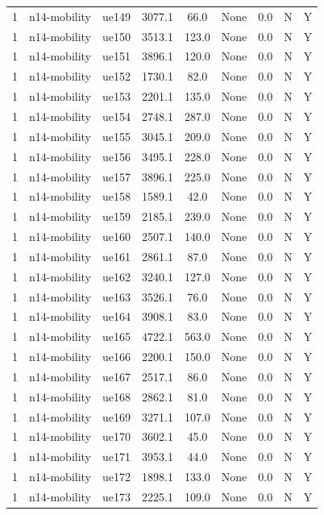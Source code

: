 \begin{table}[ht]
\begin{tabular}{|c|c|c|c|c|c|c|c|c|}
1 & n14-mobility & ue149 & 3077.1 & 66.0 & None & 0.0 & N & Y \\
1 & n14-mobility & ue150 & 3513.1 & 123.0 & None & 0.0 & N & Y \\
1 & n14-mobility & ue151 & 3896.1 & 120.0 & None & 0.0 & N & Y \\
1 & n14-mobility & ue152 & 1730.1 & 82.0 & None & 0.0 & N & Y \\
1 & n14-mobility & ue153 & 2201.1 & 135.0 & None & 0.0 & N & Y \\
1 & n14-mobility & ue154 & 2748.1 & 287.0 & None & 0.0 & N & Y \\
1 & n14-mobility & ue155 & 3045.1 & 209.0 & None & 0.0 & N & Y \\
1 & n14-mobility & ue156 & 3495.1 & 228.0 & None & 0.0 & N & Y \\
1 & n14-mobility & ue157 & 3896.1 & 225.0 & None & 0.0 & N & Y \\
1 & n14-mobility & ue158 & 1589.1 & 42.0 & None & 0.0 & N & Y \\
1 & n14-mobility & ue159 & 2185.1 & 239.0 & None & 0.0 & N & Y \\
1 & n14-mobility & ue160 & 2507.1 & 140.0 & None & 0.0 & N & Y \\
1 & n14-mobility & ue161 & 2861.1 & 87.0 & None & 0.0 & N & Y \\
1 & n14-mobility & ue162 & 3240.1 & 127.0 & None & 0.0 & N & Y \\
1 & n14-mobility & ue163 & 3526.1 & 76.0 & None & 0.0 & N & Y \\
1 & n14-mobility & ue164 & 3908.1 & 83.0 & None & 0.0 & N & Y \\
1 & n14-mobility & ue165 & 4722.1 & 563.0 & None & 0.0 & N & Y \\
1 & n14-mobility & ue166 & 2200.1 & 150.0 & None & 0.0 & N & Y \\
1 & n14-mobility & ue167 & 2517.1 & 86.0 & None & 0.0 & N & Y \\
1 & n14-mobility & ue168 & 2862.1 & 81.0 & None & 0.0 & N & Y \\
1 & n14-mobility & ue169 & 3271.1 & 107.0 & None & 0.0 & N & Y \\
1 & n14-mobility & ue170 & 3602.1 & 45.0 & None & 0.0 & N & Y \\
1 & n14-mobility & ue171 & 3953.1 & 44.0 & None & 0.0 & N & Y \\
1 & n14-mobility & ue172 & 1898.1 & 133.0 & None & 0.0 & N & Y \\
1 & n14-mobility & ue173 & 2225.1 & 109.0 & None & 0.0 & N & Y \\

\end{tabular}
\end{table}
